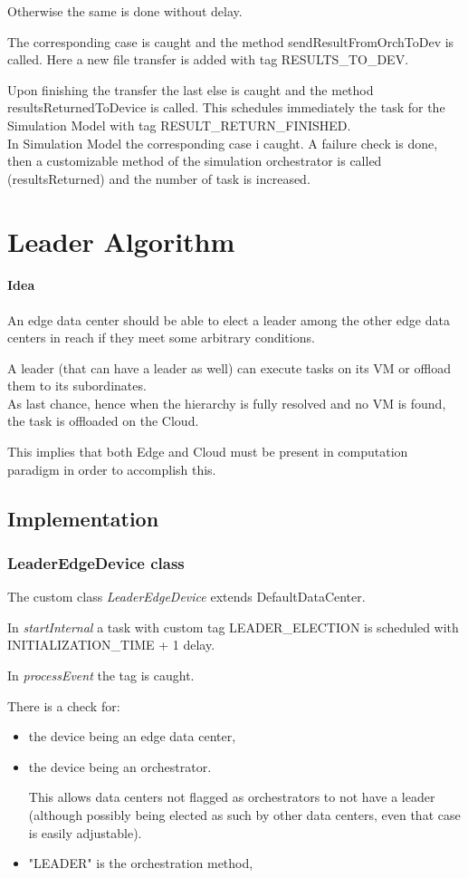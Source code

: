 \documentclass[12pt]{report}
\begin{document}
Otherwise the same is done without delay.

The corresponding case is caught and the method sendResultFromOrchToDev is called. Here a new file transfer is added with tag RESULTS\_TO\_DEV.

Upon finishing the transfer the last else is caught and the method \mbox{resultsReturnedToDevice} is called. This schedules immediately the task for the Simulation Model with tag RESULT\_RETURN\_FINISHED.
\\
In Simulation Model the corresponding case i caught. A failure check is done, then a customizable method of the simulation orchestrator is called (resultsReturned) and the number of task is increased.

\section{Leader Algorithm}
\label{leader algo}
\paragraph*{Idea}
An edge data center should be able to elect a leader among the other edge data centers in reach if they meet some arbitrary conditions.

A leader (that can have a leader as well) can execute tasks on its VM or offload them to its subordinates.\\

As last chance, hence when the hierarchy is fully resolved and no VM is found, the task is offloaded on the Cloud.

This implies that both Edge and Cloud must be present in computation paradigm in order to accomplish this.

\subsection*{Implementation}

\subsubsection*{LeaderEdgeDevice class}
The custom class \textit{LeaderEdgeDevice} extends DefaultDataCenter.

In \textit{startInternal} a task with custom tag LEADER\_ELECTION is scheduled with INITIALIZATION\_TIME + 1 delay.

In \textit{processEvent} the tag is caught.

There is a check for:
 	\begin{itemize}
 		\item the device being an edge data center,
 		\item the device being an orchestrator.
 		
 		This allows data centers not flagged as orchestrators to not have a leader (although possibly being elected as such by other data centers, even that case is easily adjustable).
 		\item "LEADER" is the orchestration method,
  	\end{itemize}
\end{document}
